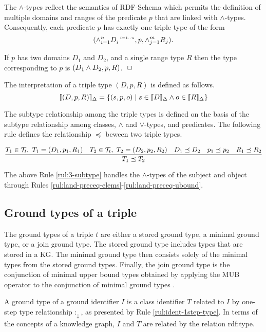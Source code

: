 \documentclass[runningheads]{llncs}
\newcommand{\s}{\scriptscriptstyle\ \,}
\newcommand{\darr}{\downarrow}
\newcommand{\llb}{\llbracket}
\newcommand{\rrb}{\rrbracket}
\newcommand{\T}{{\cal T}}
\newcommand{\finbox}{\phantom{.}\hfill\Box}
\begin{document}
The $\land$-types reflect the semantics of RDF-Schema \cite{rdfschema}
which permits the definition of multiple domains and ranges of the
predicate $p$ that are linked with $\land$-types. Consequently, each
predicate $p$ has exactly one triple type of the form
$$(\land_{i=1}^n\/D_i^{\s\/i=1..n}, p ,\land_{j=1}^m\/R_j).$$

\begin{example}
  If $p$ has two domains $D_1$ and $D_2$, and a single
range type $R$ then the type corresponding to $p$ is
$(D_1\land\/D_2,p,R)$. $\finbox$
\end{example}

\noindent
The interpretation of a triple type $(D,p,R)$ is defined as
follows.
$$\llb(D,p,R)\rrb_\Delta=\{(s,p,o)\mid\/s\in\llb\/D\rrb_\Delta\land\/o\in\llb\/R\rrb_\Delta \}$$

The subtype relationship among the triple types is defined on the
basis of the subtype relationship among classes, $\land$ and
$\lor$-types, and predicates. The following rule defines the
relationship $\preceq$ beween two triple types.

\begin{equation}
\label{rul:3-subtype}
\dfrac{T_1\in\T_t,\ T_1=(D_1,p_1,R_1)\quad T_2\in\T_t,\ T_2=(D_2,p_2,R_2)\quad\/D_1\preceq\/D_2\quad\/p_1\preceq\/p_2\quad\/R_1\preceq\/R_2}
      {T_1\preceq\/T_2}
\end{equation}

\noindent
The above Rule \ref{rul:3-subtype} handles the $\land$-types of the
subject and object through Rules
\ref{rul:land-preceq-elems}-\ref{rul:land-preceq-ubound}.






\subsection{Ground types of a triple\label{sec:3-ground-types}}

\noindent
The ground types of a triple $t$ are either a stored ground type, a
minimal ground type, or a join ground type. The stored ground type
includes types that are stored in a KG. The minimal ground type then
consists solely of the minimal types from the stored ground
types. Finally, the join ground type is the conjunction of minimal
upper bound types obtained by applying the MUB operator to the conjunction
of minimal ground types \cite{Knudstorp2024}.
 
A ground type of a ground identifier $I$ is a class identifier $T$
related to $I$ by one-step type relationship $:_\darr$, as presented
by Rule \ref{rul:ident-1step-type}. In terms of the concepts of a
knowledge graph, $I$ and $T$ are related by the relation rdf:type.
\end{document}
